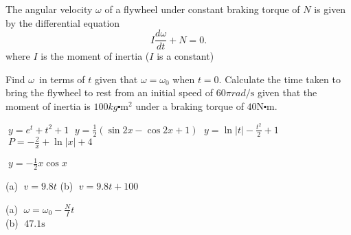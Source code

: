\begin{Exercise}[title={Differential Equations},label=exDiffEqns]
\Question The angular velocity
$\omega $ of a flywheel under constant braking torque of $N$ is given by the differential equation
\begin{equation*}I \frac{d \omega }{d t} +N =0.
\end{equation*}where $I$ is the moment of inertia ($I$ is a constant) 
\begin{tasks}
	\task Find $\omega $\ in terms of $t$ given that $\omega  =\omega _{0}$ when $t =0$. 	
	\task Calculate the time taken to bring the flywheel to rest from an initial
	speed of $60 \pi  rad/\mbox{s}$ given that the moment of inertia is $100 kg \centerdot \mathrm{m}^{2}$ under a braking torque of $40 \mathrm{N} \centerdot \mbox{m}\text{.}$ \end{tasks}

\end{Exercise}
\begin{Answer}[ref={exDiffEqns}]
\Question %
\begin{tasks}
	\task $\;y =e^{t} +t^{2} +1$ 
	\task $\;y =\frac{1}{2} \left (\sin  2 x -\cos  2 x +1\right )$
	\task $\;y =\ln  \left \vert t\right \vert  -\frac{t^{2}}{2} +1$ 
	\task $\;P = -\frac{2}{x} +\ln  \left \vert x\right \vert  +4$ 
\end{tasks}

\Question %
\Question %

\Question %
$\;y = -\frac{1}{2} x \cos  x$

\Question %
(a) $\;v =9.8 t$ (b) $\;v =9.8 t +100$

\Question %
(a) $\;\omega  =\omega _{0} -\frac{N}{I} t$ \\
(b) $\;47.1 \mbox{s}$
\end{Answer}%

